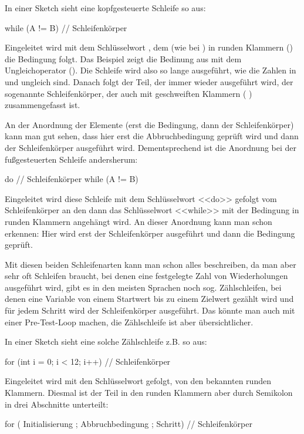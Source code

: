 In einer Sketch sieht eine kopfgesteuerte Schleife so aus:

\begin{src}
while (A != B)
{
  // Schleifenkörper
}
\end{src}

Eingeleitet wird mit dem Schlüsselwort , dem (wie bei ) in runden Klammern (\code{()})
die Bedingung folgt. Das Beispiel zeigt die Bedinung aus   mit dem Ungleichoperator (\code{!=}).
Die Schleife wird also so lange ausgeführt, wie die Zahlen in  und  ungleich sind.
Danach folgt der Teil, der immer wieder ausgeführt wird, der sogenannte Schleifenkörper, der auch
mit geschweiften Klammern (  ) zusammengefasst ist.

An der Anordnung der Elemente (erst die Bedingung, dann der Schleifenkörper) kann man gut sehen, dass
hier erst die Abbruchbedingung geprüft wird und dann der Schleifenkörper ausgeführt wird.
Dementsprechend ist die Anordnung bei der fußgesteuerten Schleife andersherum:

\begin{src}
do
{
  // Schleifenkörper
} while (A != B)
\end{src}

Eingeleitet wird diese Schleife mit dem Schlüsselwort <<do>> gefolgt vom Schleifenkörper an den dann
das Schlüsselwort <<while>> mit der Bedingung in runden Klammern angehängt wird.
An dieser Anordnung kann man schon erkennen:
Hier wird erst der Schleifenkörper ausgeführt und dann die Bedingung geprüft.

Mit diesen beiden Schleifenarten kann man schon alles beschreiben, da man aber sehr oft Schleifen
braucht, bei denen eine festgelegte Zahl von Wiederholungen ausgeführt wird, gibt es in den
meisten Sprachen noch sog. Zählschleifen, bei denen eine Variable von einem Startwert bis zu einem
Zielwert gezählt wird und für jedem Schritt wird der Schleifenkörper ausgeführt.
Das könnte man auch mit einer Pre-Test-Loop machen, die Zählschleife ist aber übersichtlicher.

In einer Sketch sieht eine solche Zählschleife z.B. so aus:

\begin{src}
for (int i = 0; i < 12; i++)
{
  // Schleifenkörper
}
\end{src}

Eingeleitet wird mit den Schlüsselwort  gefolgt, von den bekannten runden Klammern.
Diesmal ist der Teil in den runden Klammern aber durch Semikolon in drei Abschnitte unterteilt:
\begin{src}
for ( Initialisierung ;  
  Abbruchbedingung ; 
  Schritt)
{
  // Schleifenkörper
}
\end{src}

